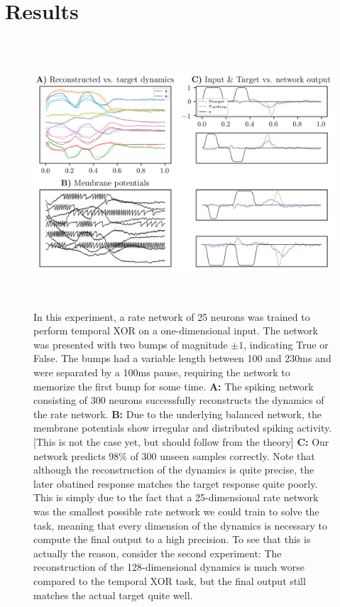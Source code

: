 \documentclass[twoside,11pt,titlepage]{article}
\begin{document}
\section{Results}

\begin{figure}[!htb]
  \includegraphics[width = \columnwidth, height=10cm]{figures/figure2.png}
  \caption{In this experiment, a rate network of 25 neurons was trained to perform
  temporal XOR on a one-dimensional input. The network was presented with two bumps
  of magnitude $\pm 1$, indicating True or False. The bumps had a variable length
  between 100 and 230ms and were separated by a 100ms pause, requiring the network
  to memorize the first bump for some time. \textbf{A:} The spiking network consisting
  of 300 neurons successfully reconstructs the dynamics of the rate network.
  \textbf{B:} Due to the underlying balanced network, the membrane potentials show
  irregular and distributed spiking activity. [This is not the case yet, but should follow from the theory]
  \textbf{C:} Our network predicts 98\% of 300 unseen samples correctly. Note that although the
  reconstruction of the dynamics is quite precise, the later obatined response matches
  the target response quite poorly. This is simply due to the fact that a 25-dimensional
  rate network was the smallest possible rate network we could train to solve the task, meaning
  that every dimension of the dynamics is necessary to compute the final output to a high
  precision. To see that this is actually the reason, consider the second experiment:
  The reconstruction of the 128-dimensional dynamics is much worse compared to the temporal
  XOR task, but the final output still matches the actual target quite well.}
  \label{fig:figure2}
\end{figure}
\end{document}

